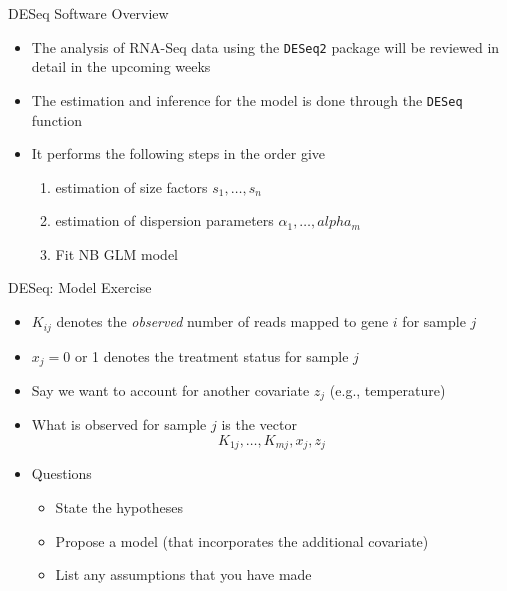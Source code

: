 \documentclass[xcolor=x11names,compress]{beamer}\usepackage[]{graphicx}\usepackage[]{color}
\begin{document}
\begin{frame}{DESeq Software Overview}
  \begin{itemize}
  \item The analysis of RNA-Seq data  using the {\tt DESeq2} package will be 
        reviewed in detail in the upcoming weeks
  \item The estimation and inference for the model is done through the {\tt DESeq}
    function
  \item It performs the following steps in the order give
    \begin{enumerate}
    \item estimation of size factors $s_1,\ldots,s_n$
    \item estimation of dispersion parameters $\alpha_1,\ldots,alpha_m$
    \item Fit NB GLM model
     \end{enumerate}
  \end{itemize}
\end{frame}


\begin{frame}{DESeq: Model Exercise}
  \begin{itemize}
   \item $K_{ij}$ denotes the {\it observed} number of reads mapped to gene $i$ for sample $j$
  \item $x_j=0$ or 1 denotes the treatment status for sample $j$
  \item Say we want to account for another covariate $z_j$ (e.g., temperature)
  \item What is observed for sample $j$ is the vector
    \begin{equation*}
      K_{1j},\ldots,K_{mj},x_j,z_j
    \end{equation*}
  \item Questions
    \begin{itemize}
    \item State the hypotheses
    \item Propose a model (that incorporates the additional covariate)
    \item List any assumptions that you have made
    \end{itemize}
  \end{itemize}
\end{frame}
\end{document}

